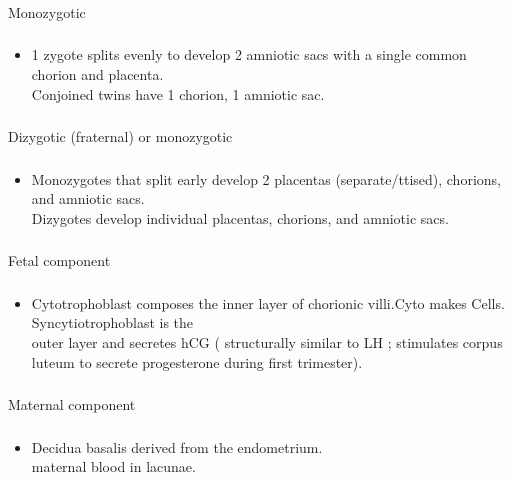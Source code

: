 \documentclass[11pt]{beamer}
\begin{document}
\begin{frame}
 \frametitle{}
Monozygotic
\end{frame}

\begin{frame}
 \frametitle{}
\begin{itemize}
\item{1 zygote splits evenly to develop 2 amniotic sacs with a single common chorion and placenta. \\ Conjoined twins have 1 chorion, 1 amniotic sac.}
\end{itemize}
\end{frame}

\begin{frame}
 \frametitle{}
Dizygotic (fraternal) or monozygotic
\end{frame}

\begin{frame}
 \frametitle{}
\begin{itemize}
\item{Monozygotes that split early develop 2 placentas (separate/ttised), chorions, and amniotic sacs. \\ Dizygotes develop individual placentas, chorions, and amniotic sacs.}
\end{itemize}
\end{frame}

\begin{frame}
 \frametitle{}
Fetal component
\end{frame}

\begin{frame}
 \frametitle{}
\begin{itemize}
\item{Cytotrophoblast composes the inner layer of chorionic villi.Cyto makes Cells.  Syncytiotrophoblast is the \\ outer layer and secretes hCG ( structurally similar to LH ; stimulates  corpus luteum to secrete
progesterone during first trimester).}
\end{itemize}
\end{frame}

\begin{frame}
 \frametitle{}
Maternal component
\end{frame}

\begin{frame}
 \frametitle{}
\begin{itemize}
\item{Decidua basalis derived from the endometrium. \\ maternal blood in lacunae. }
\end{itemize}
\end{frame}
\end{document}
